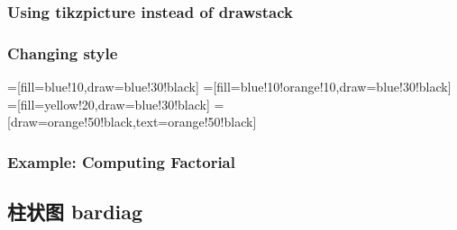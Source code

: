 \begin{drawstack}
   
\end{drawstack}

\subsubsection{Using tikzpicture instead of drawstack}

%
%


\subsubsection{Changing style}

{%
=[fill=blue!10,draw=blue!30!black]
=[fill=blue!10!orange!10,draw=blue!30!black]
=[fill=yellow!20,draw=blue!30!black]
=[draw=orange!50!black,text=orange!50!black]

\begin{drawstack}
   
\end{drawstack}
}

\subsubsection{Example: Computing Factorial}

\begin{drawstack}[scale=0.8]
  \startframe
  \startframe
  \cell{$\vdots$}
  \startframe
\end{drawstack}

\subsection{柱状图 bardiag}
